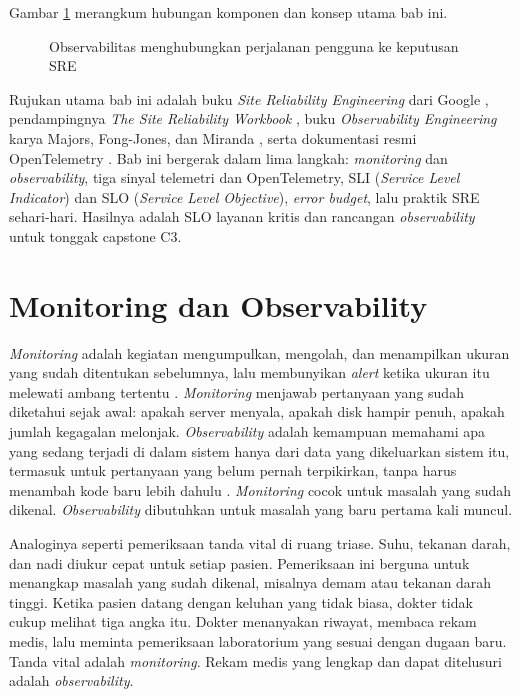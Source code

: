   Gambar \ref{fig:ch11-dasbor-hijau} merangkum hubungan komponen dan konsep utama bab ini.
\begin{figure}[!htb]
  \centering
  
  \caption{Observabilitas menghubungkan perjalanan pengguna ke keputusan SRE}
  \label{fig:ch11-dasbor-hijau}
\end{figure}

Rujukan utama bab ini adalah buku \textit{Site Reliability Engineering} dari Google
\cite{beyer2016}, pendampingnya \textit{The Site Reliability Workbook} \cite{c11-sre-workbook},
buku \textit{Observability Engineering} karya Majors, Fong-Jones, dan Miranda
\cite{c11-majors2022}, serta dokumentasi resmi OpenTelemetry \cite{opentelemetry,c11-otel-signals}.
Bab ini bergerak dalam lima langkah: \textit{monitoring} dan \textit{observability}, tiga sinyal
telemetri dan OpenTelemetry, SLI (\textit{Service Level Indicator}) dan SLO (\textit{Service Level
Objective}), \textit{error budget}, lalu praktik SRE sehari-hari.
Hasilnya adalah SLO layanan kritis dan rancangan \textit{observability} untuk tonggak capstone C3.

\section{Monitoring dan Observability}
\label{sec:ch11-observability}

\textit{Monitoring} adalah kegiatan mengumpulkan, mengolah, dan menampilkan ukuran yang sudah
ditentukan sebelumnya, lalu membunyikan \textit{alert} ketika ukuran itu melewati ambang tertentu
\cite{beyer2016}. \textit{Monitoring} menjawab pertanyaan yang sudah diketahui sejak awal: apakah
server menyala, apakah disk hampir penuh, apakah jumlah kegagalan melonjak. \textit{Observability}
adalah kemampuan memahami apa yang sedang terjadi di dalam sistem hanya dari data yang dikeluarkan
sistem itu, termasuk untuk pertanyaan yang belum pernah terpikirkan, tanpa harus menambah kode baru
lebih dahulu \cite{c11-majors2022}. \textit{Monitoring} cocok untuk masalah yang sudah dikenal.
\textit{Observability} dibutuhkan untuk masalah yang baru pertama kali muncul.

Analoginya seperti pemeriksaan tanda vital di ruang triase. Suhu, tekanan darah, dan nadi diukur
cepat untuk setiap pasien. Pemeriksaan ini berguna untuk menangkap masalah yang sudah dikenal,
misalnya demam atau tekanan darah tinggi. Ketika pasien datang dengan keluhan yang tidak biasa,
dokter tidak cukup melihat tiga angka itu. Dokter menanyakan riwayat, membaca rekam medis, lalu
meminta pemeriksaan laboratorium yang sesuai dengan dugaan baru. Tanda vital adalah
\textit{monitoring}. Rekam medis yang lengkap dan dapat ditelusuri adalah \textit{observability}.

